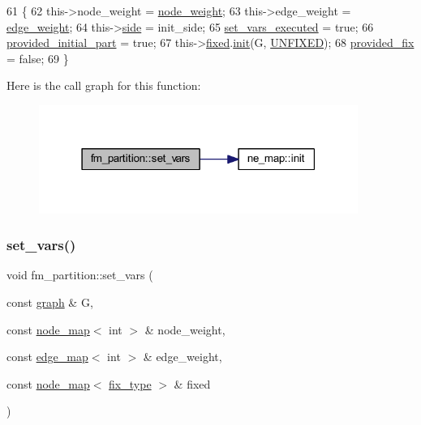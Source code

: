 \begin{DoxyCode}
61 \{
62     this->node\_weight = \mbox{\hyperlink{classfm__partition_ae1ba643b4bd6721075ab7b608bcf3cd6}{node\_weight}};
63     this->edge\_weight = \mbox{\hyperlink{classfm__partition_adfe6147ba3f9c785f613b472f950595f}{edge\_weight}};
64     this->\mbox{\hyperlink{classfm__partition_af83309e781e9658fc0ff923ced087bfc}{side}} = init\_side;
65     \mbox{\hyperlink{classfm__partition_a58edb78c4da479cd790da1eed1a30eab}{set\_vars\_executed}} = \textcolor{keyword}{true};
66     \mbox{\hyperlink{classfm__partition_a38c67abb32d7ade03b68f0a7ed9f1c6d}{provided\_initial\_part}} = \textcolor{keyword}{true};
67     this->\mbox{\hyperlink{classfm__partition_a3b04658dbb5b27ddd20194ff74a71082}{fixed}}.\mbox{\hyperlink{classne__map_a4ef2ab4aebcb57a7a101975bf6a88e24}{init}}(G, \mbox{\hyperlink{classfm__partition_a24447561db0ea633212c597c5e1fca56}{UNFIXED}});
68     \mbox{\hyperlink{classfm__partition_a0aca0fa4fcaba284d61c745d17022f8d}{provided\_fix}} = \textcolor{keyword}{false};
69 \}
\end{DoxyCode}
Here is the call graph for this function\+:\nopagebreak
\begin{figure}[H]
\begin{center}
\leavevmode
\includegraphics[width=295pt]{classfm__partition_af4d1b1275050cc7f4327500cec1f6e88_cgraph}
\end{center}
\end{figure}
\mbox{\label{classfm__partition_ad0bebf48731e99fbf7a8c6526ab0f9a6}} 
\subsubsection{\texorpdfstring{set\+\_\+vars()}{set\_vars()}\hspace{0.1cm}{\footnotesize\ttfamily [3/4]}}
{\footnotesize\ttfamily void fm\+\_\+partition\+::set\+\_\+vars (\begin{DoxyParamCaption}\item[{const \mbox{\hyperlink{classgraph}{graph}} \&}]{G,  }\item[{const \mbox{\hyperlink{classnode__map}{node\+\_\+map}}$<$ int $>$ \&}]{node\+\_\+weight,  }\item[{const \mbox{\hyperlink{classedge__map}{edge\+\_\+map}}$<$ int $>$ \&}]{edge\+\_\+weight,  }\item[{const \mbox{\hyperlink{classnode__map}{node\+\_\+map}}$<$ \mbox{\hyperlink{classfm__partition_a63693cd93d587dca3d1842f831cd1c55}{fix\+\_\+type}} $>$ \&}]{fixed }\end{DoxyParamCaption})}

